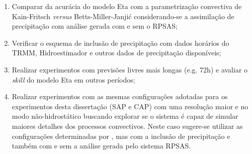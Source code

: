 \begin{enumerate}
\item Comparar da acurácia do modelo Eta com a parametrização convectiva de Kain-Fritsch \textit{versus} Betts-Miller-Janjić considerando-se a assimilação de precipitação com análise gerada com e sem o RPSAS;
\item Verificar o esquema de inclusão de precipitação com dados horários do TRMM, Hidroestimador e outros dados de precipitação disponíveis;
\item Realizar experimentos com previsões livres mais longas (e.g. 72h) e avaliar o \textit{skill} do modelo Eta em outros períodos;
\item Realizar experimentos com as mesmas configurações adotadas para os experimentos desta dissertação (SAP e CAP) com uma resolução maior e no modo não-hidrostático buscando explorar se o sistema é capaz de simular maiores detalhes dos processos convectivos. Neste caso sugere-se utilizar as configurações determinadas por , mas com a inclusão de precipitação e também com e sem a análise gerada pelo sistema RPSAS.
\end{enumerate}
